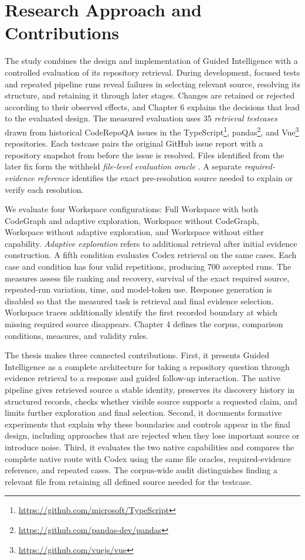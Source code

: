 \section{Research Approach and Contributions}\label{sec:research-approach-and-contributions}

The study combines the design and implementation of Guided Intelligence with a controlled evaluation of its repository retrieval. During development, focused tests and repeated pipeline runs reveal failures in selecting relevant source, resolving its structure, and retaining it through later stages. Changes are retained or rejected according to their observed effects, and Chapter 6 explains the decisions that lead to the evaluated design. The measured evaluation uses 35 \emph{retrieval testcases} drawn from historical CodeRepoQA issues in the TypeScript\footnote{\url{https://github.com/microsoft/TypeScript}}, pandas\footnote{\url{https://github.com/pandas-dev/pandas}}, and Vue\footnote{\url{https://github.com/vuejs/vue}} repositories. Each testcase pairs the original GitHub issue report with a repository snapshot from before the issue is resolved. Files identified from the later fix form the withheld \emph{file-level evaluation oracle} \textcite{Hu2025CodeRepoQA}. A separate \emph{required-evidence reference} identifies the exact pre-resolution source needed to explain or verify each resolution.

We evaluate four Workspace configurations: Full Workspace with both CodeGraph and adaptive exploration, Workspace without CodeGraph, Workspace without adaptive exploration, and Workspace without either capability. \emph{Adaptive exploration} refers to additional retrieval after initial evidence construction. A fifth condition evaluates Codex retrieval on the same cases. Each case and condition has four valid repetitions, producing 700 accepted runs. The measures assess file ranking and recovery, survival of the exact required source, repeated-run variation, time, and model-token use. Response generation is disabled so that the measured task is retrieval and final evidence selection. Workspace traces additionally identify the first recorded boundary at which missing required source disappears. Chapter 4 defines the corpus, comparison conditions, measures, and validity rules.

The thesis makes three connected contributions. First, it presents Guided Intelligence as a complete architecture for taking a repository question through evidence retrieval to a response and guided follow-up interaction. The native pipeline gives retrieved source a stable identity, preserves its discovery history in structured records, checks whether visible source supports a requested claim, and limits further exploration and final selection. Second, it documents formative experiments that explain why these boundaries and controls appear in the final design, including approaches that are rejected when they lose important source or introduce noise. Third, it evaluates the two native capabilities and compares the complete native route with Codex using the same file oracles, required-evidence reference, and repeated cases. The corpus-wide audit distinguishes finding a relevant file from retaining all defined source needed for the testcase.

